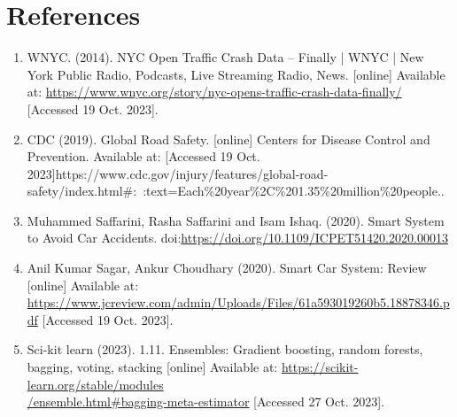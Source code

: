 \documentclass[12pt, a4paper]{article}
\begin{document}
\section*{References}
\begin{enumerate}
\item WNYC. (2014). NYC Open Traffic Crash Data -- Finally | WNYC | New York Public Radio, Podcasts, Live Streaming Radio, News. [online] Available at: \href{https://www.wnyc.org/story/nyc-opens-traffic-crash-data-finally/}{https://www.wnyc.org/story/nyc-opens-traffic-crash-data-finally/} [Accessed 19 Oct. 2023].
\item CDC (2019). Global Road Safety. [online] Centers for Disease Control and Prevention. Available at: \href{https://www.cdc.gov/injury/features/global-road-safety/index.html\#:~:text=Each%20year%2C%201.35%20million%20people} [Accessed 19 Oct. 2023]{https://www.cdc.gov/injury/features/global-road-safety/index.html\#:~:text=Each\%20year\%2C\%201.35\%20million\%20people.}.
‌\item Muhammed Saffarini, Rasha Saffarini and Isam Ishaq. (2020). Smart System to Avoid Car Accidents. doi:\href{https://doi.org/10.1109/ICPET51420.2020.00013}{https://doi.org/10.1109/ICPET51420.2020.00013}
‌\item Anil Kumar Sagar, Ankur Choudhary (2020). Smart Car System: Review [online] Available at: \\ \href{https://www.jcreview.com/admin/Uploads/Files/61a593019260b5.18878346.pdf}{https://www.jcreview.com/admin/Uploads/Files/61a593019260b5.18878346.pdf} [Accessed 19 Oct. 2023].
\item Sci-kit learn (2023). 1.11. Ensembles: Gradient boosting, random forests, bagging, voting, stacking [online] Available at: \href{https://scikit-learn.org/stable/modules/ensemble.html\#bagging-meta-estimator}{https://scikit-learn.org/stable/modules\\/ensemble.html\#bagging-meta-estimator} [Accessed 27 Oct. 2023].
‌

‌\end{enumerate}
\end{document}
